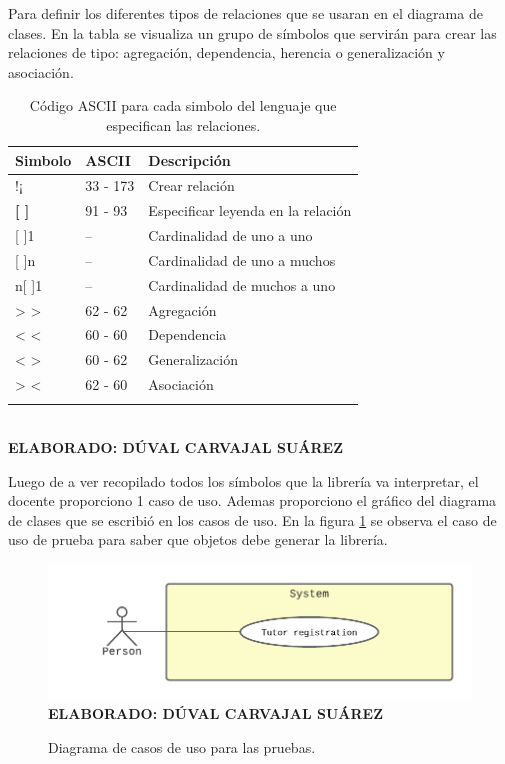 Para definir los diferentes tipos de relaciones que se usaran en el diagrama de clases. En la tabla se visualiza un grupo de símbolos que servirán para crear las relaciones de tipo: agregación, dependencia, herencia o generalización y asociación. 

\begin{table}[h!]
	\caption{Código ASCII para cada simbolo del lenguaje que especifican las relaciones.}
	\begin{tabular}{p{2cm}p{4cm}p{6cm}}
		\toprule
		\textbf{Simbolo} & \textbf{ASCII} & \textbf{Descripción} \\
		\midrule
		!¡ & 33 - 173 & Crear relación \\
		\addlinespace
		\textbf{[ ]} & 91 - 93 & Especificar leyenda en la relación \\
		\addlinespace
		1[ ]1 & -- & Cardinalidad de uno a uno \\
		\addlinespace
		1[ ]n & -- & Cardinalidad de uno a muchos \\
		\addlinespace
		n[ ]1 & -- & Cardinalidad de muchos a uno \\
		\addlinespace
		> > & 62 - 62 & Agregación \\
		\addlinespace
		< < & 60 - 60 & Dependencia \\
		\addlinespace
		< > & 60 - 62 & Generalización \\
		\addlinespace
		> < & 62 - 60 & Asociación \\
		\addlinespace
		\bottomrule
	\end{tabular}
	\textbf{ \\ ELABORADO: DÚVAL CARVAJAL SUÁREZ}
\end{table}

Luego de a ver recopilado todos los símbolos que la librería va interpretar, el docente proporciono 1 caso de uso. Ademas proporciono el gráfico del diagrama de clases que se escribió en los casos de uso. En la figura \ref{fig:usecasetest} se observa el caso de uso de prueba para saber que objetos debe generar la librería.

\begin{figure}[h!]
	\caption{Diagrama de casos de uso para las pruebas.}
	\includegraphics[width=15cm]{img/usecaseTest.png}
	\label{fig:usecasetest}
	\textbf{\\ ELABORADO: DÚVAL CARVAJAL SUÁREZ}
\end{figure}

